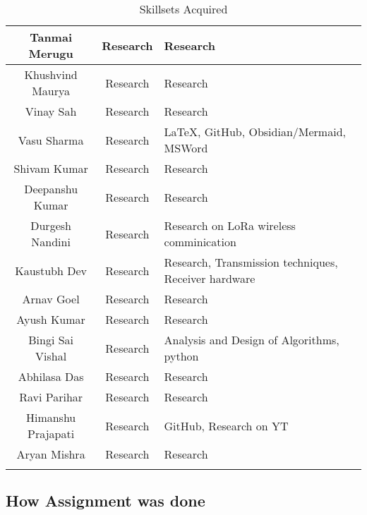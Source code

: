 \begin{center}
\begin{longtable}{ | c | c | m{6cm} | }
        \hline 
        Tanmai Merugu & Research & Research\\ 
        \hline 
        Khushvind Maurya & Research & Research\\ 
        \hline 
        Vinay Sah & Research & Research\\ 
        \hline 
        Vasu Sharma & Research & LaTeX, GitHub, Obsidian/Mermaid, MSWord\\ 
        \hline 
        Shivam Kumar & Research & Research\\ 
        \hline 
        Deepanshu Kumar & Research & Research\\ 
        \hline 
        Durgesh Nandini & Research & Research on LoRa wireless comminication\\ 
        \hline 
        Kaustubh Dev & Research & Research, Transmission techniques, Receiver hardware\\ 
        \hline 
        Arnav Goel & Research & Research\\ 
        \hline 
        Ayush Kumar & Research & Research\\ 
        \hline 
        Bingi Sai Vishal & Research & Analysis and Design of Algorithms, python\\ 
        \hline 
        Abhilasa Das & Research & Research\\ 
        \hline 
        Ravi Parihar & Research & Research\\ 
        \hline 
        Himanshu Prajapati & Research & GitHub, Research on YT\\ 
        \hline 
        Aryan Mishra & Research & Research\\ 
        \hline 

        \hline
        \caption{Skillsets Acquired}
    \end{longtable}
\end{center}

\newpage
\subsection{How Assignment was done}


